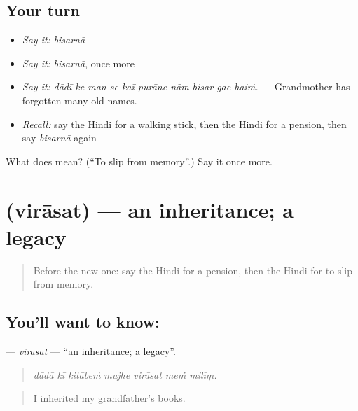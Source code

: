 \subsection*{Your turn}
\begin{itemize}
\raggedright
  \item \emph{Say it:} \emph{bisarnā}
  \item \emph{Say it:} \emph{bisarnā}, once more
  \item \emph{Say it:} \emph{dādī ke man se kaī purāne nām bisar gae haiṁ.} — Grandmother has forgotten many old names.
  \item \emph{Recall:} say the Hindi for a walking stick, then the Hindi for a pension, then say \emph{bisarnā} again
\end{itemize}

\begin{tcolorbox}[breakable,colback=teal!4,colframe=teal!35!black,title={Before you move on}]
What does  mean? (\textquotedblleft{}To slip from memory\textquotedblright{}.) Say it once more.
\end{tcolorbox}
\section[\texorpdfstring{\hi{विरासत} (virāsat)}{विरासत (virāsat)}]{ (virāsat) — an inheritance; a legacy}

\label{lesson:HI-C504-virasat}



\begin{quote}
Before the new one: say the Hindi for a pension, then the Hindi for to slip from memory.
\end{quote}

\subsection*{You'll want to know: }
\textbf{} — \emph{virāsat} — \textquotedblleft{}an inheritance; a legacy\textquotedblright{}.

\begin{quote}
      
\end{quote}

\begin{quote}
\emph{dādā kī kitābeṁ mujhe virāsat meṁ milīṃ.}
\end{quote}

\begin{quote}
I inherited my grandfather's books.
\end{quote}

